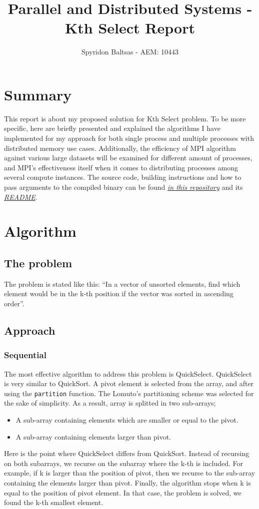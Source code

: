 \documentclass[11pt]{article}
\author{Spyridon Baltsas - AEM: 10443}
\date{}
\title{Parallel and Distributed Systems - Kth Select Report}
\begin{document}
\maketitle

\section{Summary}
\label{sec:orga8d05a3}
This report is about my proposed solution for Kth Select problem. To be more specific, here are briefly presented and explained the algorithms I have implemented for my approach for both single process and multiple processes with distributed memory use cases. Additionally, the efficiency of MPI algorithm against various large datasets will be examined for different amount of processes, and MPI's effectiveness itself when it comes to distributing processes among several compute instances. The source code, building instructions and how to pass arguments to the compiled binary can be found \href{https://github.com/thetonk/pds-solutions/tree/main/Kth\%20Select}{\emph{in this repository}} and its \href{https://github.com/thetonk/pds-solutions/blob/main/Kth\%20Select/README.md}{\emph{README}}.

\section{Algorithm}
\label{sec:orgb59a8d7}
\subsection{The problem}
\label{sec:org599f0f9}
The problem is stated like this: ``In a vector of unsorted elements, find which element would be in the k-th position if the vector was sorted in ascending order''.
\subsection{Approach}
\label{sec:org3c01fd1}
\subsubsection{Sequential}
\label{sec:orge224e3d}
The most effective algorithm to address this problem is QuickSelect. QuickSelect is very similar to QuickSort. A pivot element is selected from the array, and after using the \texttt{partition} function. The Lomuto's partitioning scheme was selected for the sake of simplicity. As a result, array is splitted in two sub-arrays;
\begin{itemize}
\item A sub-array containing elements which are smaller or equal to the pivot.
\item A sub-array containing elements larger than pivot.
\end{itemize}
Here is the point where QuickSelect differs from QuickSort. Instead of recursing on both subarrays, we recurse on the subarray where the k-th is included. For example, if k is larger than the position of pivot, then we recurse to the sub-array containing the elements larger than pivot. Finally, the algorithm stops when k is equal to the position of pivot element. In that case, the problem is solved, we found the k-th smallest element.
\end{document}
